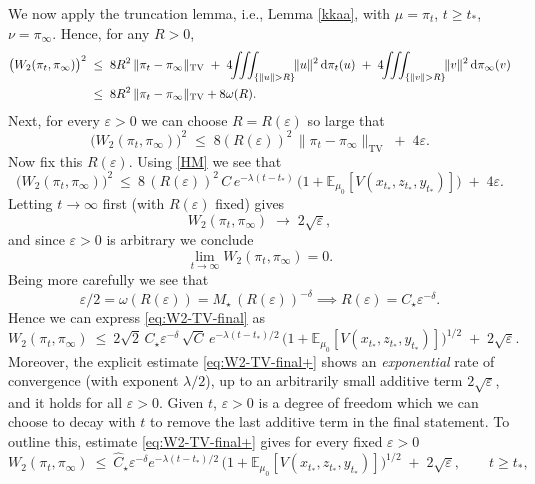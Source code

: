 \documentclass[11pt, a4paper,leqno]{amsart}
\theoremstyle{definition}
\numberwithin{equation}{section}
\begin{document}
We now apply the truncation lemma, i.e., Lemma \ref{kkaa}, with $\mu=\pi_t$, $t\geq t_\ast$,  $\nu=\pi_\infty$. Hence, for any $R>0$,
\begin{align}\label{eq:W2-TV}
\bigl (W_2(\pi_t,\pi_\infty)\bigr )^2
\;&\le\; 8R^2\,\|\pi_t-\pi_\infty\|_{\mathrm{TV}}
\;+\;4\!\!\iiint_{\{\|u\|>R\}}\!\!\|u\|^2\,\mathrm d \pi_t(u)
\;+\;4\!\!\iiint_{\{\|v\|>R\}}\!\!\|v\|^2\, \mathrm d \pi_\infty(v)\notag\\
&\le \; 8R^2\,\|\pi_t-\pi_\infty\|_{\mathrm{TV}}+8\omega(R).
\end{align}
Next, for every $\varepsilon>0$ we can choose $R=R(\varepsilon)$ so large that
\[
\bigl (W_2(\pi_t,\pi_\infty)\bigr )^2
\;\le\; 8(R(\varepsilon))^2\,\|\pi_t-\pi_\infty\|_{\mathrm{TV}}
\;+\;4\varepsilon.
\]
Now fix this $R(\varepsilon)$.  Using \eqref{HM} we see that
\begin{equation}\label{eq:W2-TV-final}
\bigl (W_2(\pi_t,\pi_\infty)\bigr )^2
\ \le\ 8\,(R(\varepsilon))^2\,{C}\,e^{-\lambda (t-t_\ast)}\,\bigl(1+\mathbb E_{\mu_0}[V(x_{t_\ast},z_{t_\ast},y_{t_\ast})]\bigr)
\;+\;4{\varepsilon}.
\end{equation}
Letting $t\to\infty$ first (with $R(\varepsilon)$ fixed) gives
\[
W_2(\pi_t,\pi_\infty)\;\longrightarrow\; 2\sqrt{\varepsilon},
\]
and since $\varepsilon>0$ is arbitrary we conclude
\[
\lim_{t\to\infty} W_2(\pi_t,\pi_\infty)=0.
\]
Being more carefully we see that
$$\varepsilon/2=\omega(R(\varepsilon))=M_\star\,(R(\varepsilon))^{-\delta}\implies R(\varepsilon)=C_\star\varepsilon^{-\delta}.$$
Hence we can express \eqref{eq:W2-TV-final} as
\begin{equation}\label{eq:W2-TV-final+}
W_2(\pi_t,\pi_\infty)
\ \le\ 2\sqrt{2}\, C_\star\varepsilon^{-\delta}\,\sqrt{C}\,e^{-\lambda (t-t_\ast)/2}\,\bigl(1+\mathbb E_{\mu_0}[V(x_{t_\ast},z_{t_\ast},y_{t_\ast})]\bigr)^{1/2}
\;+\;2\sqrt{\varepsilon}.
\end{equation}
Moreover, the explicit estimate \eqref{eq:W2-TV-final+} shows an \emph{exponential} rate of convergence (with exponent $\lambda/2$), up to an arbitrarily small additive term $2\sqrt{\varepsilon}$, and it holds for all $\varepsilon>0$. Given $t$, $\varepsilon>0$ is a degree of freedom which we can choose to decay with $t$ to remove the last additive term in the final statement. To outline this,  estimate \eqref{eq:W2-TV-final+} gives for every fixed $\varepsilon>0$
\[
W_2(\pi_t,\pi_\infty)
\ \le\  \hat C_\star\varepsilon^{-\delta}e^{-\lambda (t-t_\ast)/2}\,\bigl(1+\mathbb E_{\mu_0}[V(x_{t_\ast},z_{t_\ast},y_{t_\ast})]\bigr)^{1/2}\;+\;2\sqrt{\varepsilon},
\qquad t\ge t_\ast,
\]
\end{document}
